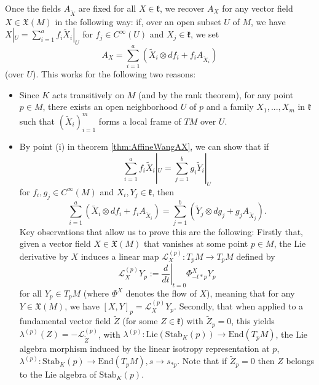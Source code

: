 \documentclass[a4paper,12pt,parskip=half*,chapterprefix=true,numbers=noendperiod]{scrreprt}
\theoremstyle{definition}
\theoremstyle{remark}
\begin{document}
Once the fields $A_{\tilde{X}}$ are fixed for all $X\in\mathfrak{k}$, we recover $A_X$ for any vector field $X\in\mathfrak{X}(M)$ in the following way: if, over an open subset $U$ of $M$, we have $X|_U=\sum_{i=1}^af_i\tilde{X}_i|_U$ for $f_j\in C^{\infty}(U)$ and $X_j\in\mathfrak{k}$, we set
\begin{equation*}
A_X=\sum_{i=1}^a\left(\tilde{X}_i\otimes df_i+f_iA_{\tilde{X}_i}\right)
\end{equation*}
(over $U$). This works for the following two reasons:
\begin{itemize}
	\item Since $K$ acts transitively on $M$ (and by the rank theorem), for any point $p\in M$, there exists an open neighborhood $U$ of $p$ and a family $X_1,...,X_m$ in $\mathfrak{k}$ such that $(\tilde{X}_i)_{i=1}^m$ forms a local frame of $TM$ over $U$.
	\item By point (i) in theorem \ref{thm:AffineWangAX}, we can show that if
	\begin{equation*}
		\sum_{i=1}^af_i\tilde{X}_i|_U=\sum_{j=1}^bg_i\tilde{Y}_i|_U
	\end{equation*}
	for $f_i,g_j\in C^{\infty}(M)$ and $X_i,Y_j\in\mathfrak{k}$, then
	\begin{equation*}
	\sum_{i=1}^a\left(\tilde{X}_i\otimes df_i+f_iA_{\tilde{X}_i}\right)=\sum_{j=1}^b\left(\tilde{Y}_j\otimes dg_j+g_jA_{\tilde{X}_j}\right).
	\end{equation*}
	Key observations that allow us to prove this are the following: Firstly that, given a vector field $X\in\mathfrak{X}(M)$ that vanishes at some point $p\in M$, the Lie derivative by $X$ induces a linear map $\mathcal{L}^{(p)}_X:T_pM\to T_pM$ defined by
	\begin{equation}
	\mathcal{L}^{(p)}_XY_p:=\left.\frac{d}{dt}\right|_{t=0}\Phi^X_{-t*p}Y_p
	\end{equation}
	for all $Y_p\in T_pM$ (where $\Phi^X$ denotes the flow of $X$), meaning that for any $Y\in\mathfrak{X}(M)$, we have $[X,Y]_p=\mathcal{L}^{(p)}_XY_p$. Secondly, that when applied to a fundamental vector field $\tilde{Z}$ (for some $Z\in\mathfrak{k}$) with $\tilde{Z}_p=0$, this yields $\lambda^{(p)}(Z)=-\mathcal{L}^{(p)}_{\tilde{Z}}$, with $\lambda^{(p)}:\text{Lie}(\text{Stab}_K(p))\to\text{End}(T_pM)$, the Lie algebra morphism induced by the linear isotropy representation at $p$, $\lambda^{(p)}:\text{Stab}_K(p)\to\text{End}(T_pM),s\to s_{*p}$. Note that if $\tilde{Z}_p=0$ then $Z$ belongs to the Lie algebra of $\text{Stab}_K(p)$.
\end{itemize}
\end{document}
